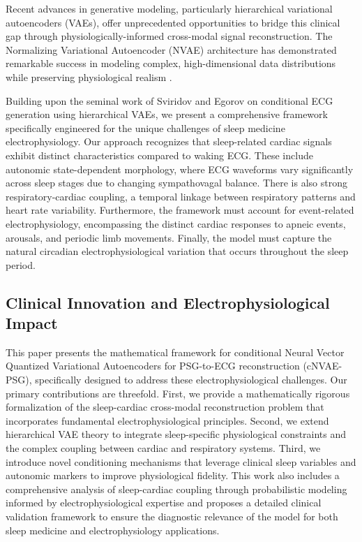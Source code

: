 \documentclass[11pt,en]{elegantpaper}
\begin{document}
Recent advances in generative modeling, particularly hierarchical variational autoencoders (VAEs), offer unprecedented opportunities to bridge this clinical gap through physiologically-informed cross-modal signal reconstruction. The Normalizing Variational Autoencoder (NVAE) architecture has demonstrated remarkable success in modeling complex, high-dimensional data distributions while preserving physiological realism \cite{vahdat2020}.

Building upon the seminal work of Sviridov and Egorov \cite{sviridov2024} on conditional ECG generation using hierarchical VAEs, we present a comprehensive framework specifically engineered for the unique challenges of sleep medicine electrophysiology. Our approach recognizes that sleep-related cardiac signals exhibit distinct characteristics compared to waking ECG. These include autonomic state-dependent morphology, where ECG waveforms vary significantly across sleep stages due to changing sympathovagal balance. There is also strong respiratory-cardiac coupling, a temporal linkage between respiratory patterns and heart rate variability. Furthermore, the framework must account for event-related electrophysiology, encompassing the distinct cardiac responses to apneic events, arousals, and periodic limb movements. Finally, the model must capture the natural circadian electrophysiological variation that occurs throughout the sleep period.

\subsection{Clinical Innovation and Electrophysiological Impact}

This paper presents the mathematical framework for conditional Neural Vector Quantized Variational Autoencoders for PSG-to-ECG reconstruction (cNVAE-PSG), specifically designed to address these electrophysiological challenges. Our primary contributions are threefold. First, we provide a mathematically rigorous formalization of the sleep-cardiac cross-modal reconstruction problem that incorporates fundamental electrophysiological principles. Second, we extend hierarchical VAE theory to integrate sleep-specific physiological constraints and the complex coupling between cardiac and respiratory systems. Third, we introduce novel conditioning mechanisms that leverage clinical sleep variables and autonomic markers to improve physiological fidelity. This work also includes a comprehensive analysis of sleep-cardiac coupling through probabilistic modeling informed by electrophysiological expertise and proposes a detailed clinical validation framework to ensure the diagnostic relevance of the model for both sleep medicine and electrophysiology applications.
\end{document}

